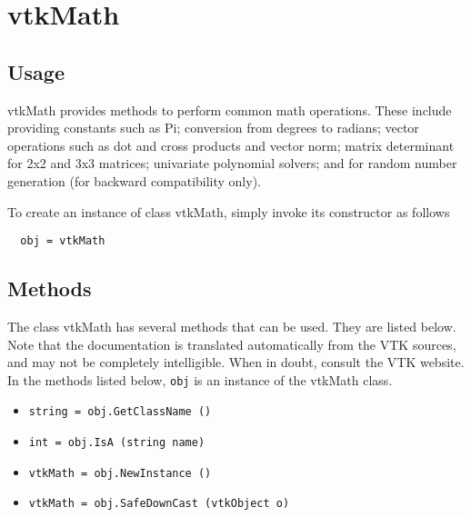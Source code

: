 \section{vtkMath}

\subsection{Usage}

 vtkMath provides methods to perform common math operations. These 
 include providing constants such as Pi; conversion from degrees to 
 radians; vector operations such as dot and cross products and vector 
 norm; matrix determinant for 2x2 and 3x3 matrices; univariate polynomial
 solvers; and for random number generation (for backward compatibility only).

To create an instance of class vtkMath, simply
invoke its constructor as follows
\begin{verbatim}
  obj = vtkMath
\end{verbatim}
\subsection{Methods}

The class vtkMath has several methods that can be used.
  They are listed below.
Note that the documentation is translated automatically from the VTK sources,
and may not be completely intelligible.  When in doubt, consult the VTK website.
In the methods listed below, \verb|obj| is an instance of the vtkMath class.
\begin{itemize}
\item  \verb|string = obj.GetClassName ()|

\item  \verb|int = obj.IsA (string name)|

\item  \verb|vtkMath = obj.NewInstance ()|

\item  \verb|vtkMath = obj.SafeDownCast (vtkObject o)|

\end{itemize}
